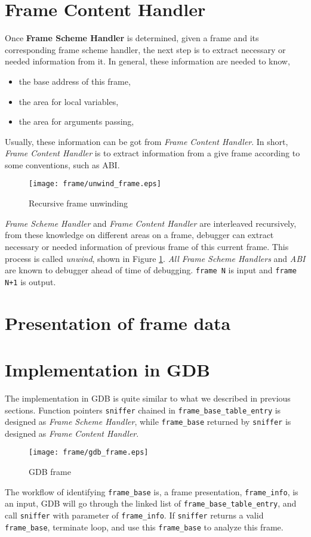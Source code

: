 \section{Frame Content Handler}
Once \textbf{Frame Scheme Handler} is determined, given a frame and its corresponding frame scheme
handler, the next step is to extract necessary or needed information from it.  In general, these
information are needed to know,
\begin{itemize}
  \item the base address of this frame,
  \item the area for local variables,
  \item the area for arguments passing,
\end{itemize}

Usually, these information can be got from \textit{Frame Content Handler}.  In short, \textit{Frame Content Handler}
is to extract information from a give frame according to some conventions, such as ABI.

\begin{figure}[htb]
  \centering
  \texttt{[image: frame/unwind\_frame.eps]}
  \caption{Recursive frame unwinding}
  \label{fig:frame:unwind}
\end{figure}

\textit{Frame Scheme Handler} and \textit{Frame Content Handler} are interleaved recursively,
from these knowledge on different areas on a frame, debugger can extract necessary or
needed information of previous frame of this current frame.  This process is called \textit{unwind},
shown in Figure \ref{fig:frame:unwind}.  \textit{All Frame Scheme Handlers} and \textit{ABI} are
known to debugger ahead of time of debugging.  \texttt{frame N} is input and \texttt{frame N+1} is
output.

\section{Presentation of frame data}

\section{Implementation in GDB}
The implementation in GDB is quite similar to what we described in previous sections.  Function pointers
\texttt{sniffer} chained in \texttt{frame\_base\_table\_entry} is designed as \textit{Frame Scheme Handler},
while \texttt{frame\_base} returned by \texttt{sniffer} is designed as \textit{Frame Content Handler}.

\begin{figure}[htb]
  \centering
  \texttt{[image: frame/gdb\_frame.eps]}
  \caption{GDB frame}
  \label{fig:frame:gdb}
\end{figure}

The workflow of identifying \texttt{frame\_base} is, a frame presentation, \texttt{frame\_info}, is an input,
GDB will go through the linked list of \texttt{frame\_base\_table\_entry}, and call \texttt{sniffer} with
parameter of \texttt{frame\_info}.  If \texttt{sniffer} returns a valid \texttt{frame\_base}, terminate loop,
and use this \texttt{frame\_base} to analyze this frame.